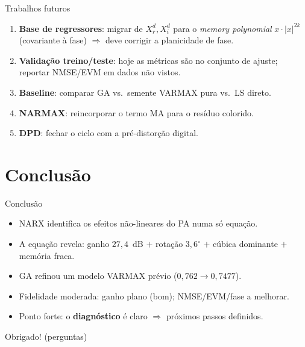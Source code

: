 \documentclass[10pt,aspectratio=169]{beamer}
\begin{document}
\begin{frame}{Trabalhos futuros}
  \begin{enumerate}\setlength\itemsep{5pt}
    \item \textbf{Base de regressores}: migrar de $X_r^d,X_i^d$ para o \emph{memory polynomial} $x\cdot|x|^{2k}$ (covariante à fase) $\Rightarrow$ deve corrigir a planicidade de fase.
    \item \textbf{Validação treino/teste}: hoje as métricas são no conjunto de ajuste; reportar NMSE/EVM em dados não vistos.
    \item \textbf{Baseline}: comparar GA vs.\ semente VARMAX pura vs.\ LS direto.
    \item \textbf{NARMAX}: reincorporar o termo MA para o resíduo colorido.
    \item \textbf{DPD}: fechar o ciclo com a pré-distorção digital.
  \end{enumerate}
\end{frame}

\section{Conclusão}
\begin{frame}{Conclusão}
  \begin{itemize}\setlength\itemsep{5pt}
    \item NARX identifica os efeitos não-lineares do PA numa só equação.
    \item A equação revela: ganho $27{,}4$~dB $+$ rotação $3{,}6^\circ$ $+$ cúbica dominante $+$ memória fraca.
    \item GA refinou um modelo VARMAX prévio ($0{,}762\to0{,}7477$).
    \item Fidelidade moderada: ganho plano (bom); NMSE/EVM/fase a melhorar.
    \item Ponto forte: o \textbf{diagnóstico} é claro $\Rightarrow$ próximos passos definidos.
  \end{itemize}
  \vspace{0.4cm}
  \begin{center}\large Obrigado! \quad \small (perguntas)\end{center}
\end{frame}
\end{document}
